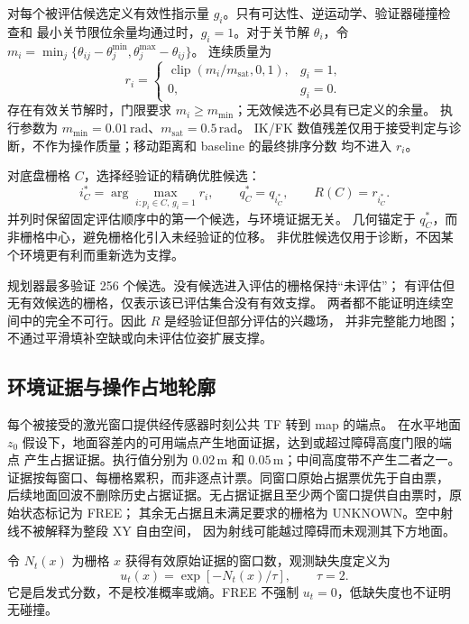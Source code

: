 对每个被评估候选定义有效性指示量 $g_i$。只有可达性、逆运动学、验证器碰撞检查和
最小关节限位余量均通过时，$g_i=1$。对于关节解 $\theta_i$，令
$m_i=\min_j\{\theta_{ij}-\theta_j^{\min},\theta_j^{\max}-\theta_{ij}\}$。
连续质量为
\begin{equation}
r_i=\begin{cases}
\operatorname{clip}(m_i/m_{\mathrm{sat}},0,1),&g_i=1,\\
0,&g_i=0.
\end{cases}
\label{eq:quality}
\end{equation}
存在有效关节解时，门限要求 $m_i\ge m_{\min}$；无效候选不必具有已定义的余量。
执行参数为 $m_{\min}=0.01\,\mathrm{rad}$、$m_{\mathrm{sat}}=0.5\,\mathrm{rad}$。
IK/FK 数值残差仅用于接受判定与诊断，不作为操作质量；移动距离和 baseline 的最终排序分数
均不进入 $r_i$。

对底盘栅格 $C$，选择经验证的精确优胜候选：
\begin{equation}
i_C^*=\arg\max_{i:p_i\in C,\,g_i=1}r_i,\qquad q_C^*=q_{i_C^*},\qquad R(C)=r_{i_C^*}.
\label{eq:winner}
\end{equation}
并列时保留固定评估顺序中的第一个候选，与环境证据无关。
几何锚定于 $q_C^*$，而非栅格中心，避免栅格化引入未经验证的位移。
非优胜候选仅用于诊断，不因某个环境更有利而重新选为支撑。

规划器最多验证 256 个候选。没有候选进入评估的栅格保持“未评估”；
有评估但无有效候选的栅格，仅表示该已评估集合没有有效支撑。
两者都不能证明连续空间中的完全不可行。因此 $R$ 是经验证但部分评估的兴趣场，
并非完整能力地图；不通过平滑填补空缺或向未评估位姿扩展支撑。

\subsection{环境证据与操作占地轮廓}
\label{sec:evidence}
每个被接受的激光窗口提供经传感器时刻公共 TF 转到 map 的端点。
在水平地面 $z_0$ 假设下，地面容差内的可用端点产生地面证据，达到或超过障碍高度门限的端点
产生占据证据。执行值分别为 $0.02\,\mathrm{m}$ 和 $0.05\,\mathrm{m}$；中间高度带不产生二者之一。
证据按每窗口、每栅格累积，而非逐点计票。同窗口原始占据票优先于自由票，
后续地面回波不删除历史占据证据。无占据证据且至少两个窗口提供自由票时，原始状态标记为 FREE；
其余无占据且未满足要求的栅格为 UNKNOWN。空中射线不被解释为整段 XY 自由空间，
因为射线可能越过障碍而未观测其下方地面。

令 $N_t(x)$ 为栅格 $x$ 获得有效原始证据的窗口数，观测缺失度定义为
\begin{equation}
u_t(x)=\exp[-N_t(x)/\tau],\qquad \tau=2.
\label{eq:deficit}
\end{equation}
它是启发式分数，不是校准概率或熵。FREE 不强制 $u_t=0$，低缺失度也不证明无碰撞。

